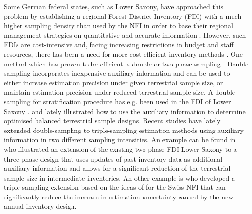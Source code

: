 Some German federal states, such as Lower Saxony, have approached this problem by establishing a regional Forest District Inventory (FDI) with a much higher sampling density than used by the NFI in order to base their regional management strategies on quantitative and accurate information \citep{bockmann1998}. However, such FDIs are cost-intensive and, facing increasing restrictions in budget and staff resources, there has been a need for more cost-efficient inventory methods \citep{vonluepke2013}. One method which has proven to be efficient is double-or two-phase sampling \citep{sarndal2003, gregoire2007, kohl2006, mandallaz2008}. Double sampling incorporates inexpensive auxiliary information and can be used to either increase estimation precision under given terrestrial sample size, or maintain estimation precision under reduced terrestrial sample size. A double sampling for stratification procedure has e.g. been used in the FDI of Lower Saxony \citep{saborowski2010}, and \citet{grafstrom2017a} lately illustrated how to use the auxiliary information to determine optimised balanced terrestrial sample designs. Recent studies have lately extended double-sampling to triple-sampling estimation methods using auxiliary information in two different sampling intensities. An example can be found in \citet{vonLuepke2012} who illustrated an extension of the existing two-phase FDI Lower Saxony to a three-phase design that uses updates of past inventory data as additional auxiliary information and allows for a significant reduction of the terrestrial sample size in intermediate inventories. An other example is \citet{massey2014a} who developed a triple-sampling extension based on the ideas of \citet{mandallaz2013c} for the Swiss NFI that can significantly reduce the increase in estimation uncertainty caused by the new annual inventory design.\par

